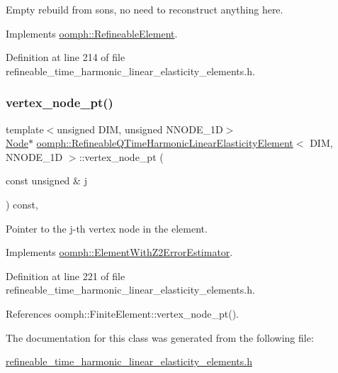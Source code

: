 Empty rebuild from sons, no need to reconstruct anything here. 



Implements \hyperlink{classoomph_1_1RefineableElement_a33324be27833fa4b78279d17158215fa}{oomph\+::\+Refineable\+Element}.



Definition at line 214 of file refineable\+\_\+time\+\_\+harmonic\+\_\+linear\+\_\+elasticity\+\_\+elements.\+h.

\mbox{\label{classoomph_1_1RefineableQTimeHarmonicLinearElasticityElement_ab78845396d1b78ba751e2feb2bf2c8a9}} 
\subsubsection{\texorpdfstring{vertex\+\_\+node\+\_\+pt()}{vertex\_node\_pt()}}
{\footnotesize\ttfamily template$<$unsigned D\+IM, unsigned N\+N\+O\+D\+E\+\_\+1D$>$ \\
\hyperlink{classoomph_1_1Node}{Node}$\ast$ \hyperlink{classoomph_1_1RefineableQTimeHarmonicLinearElasticityElement}{oomph\+::\+Refineable\+Q\+Time\+Harmonic\+Linear\+Elasticity\+Element}$<$ D\+IM, N\+N\+O\+D\+E\+\_\+1D $>$\+::vertex\+\_\+node\+\_\+pt (\begin{DoxyParamCaption}\item[{const unsigned \&}]{j }\end{DoxyParamCaption}) const\hspace{0.3cm}{\ttfamily [inline]}, {\ttfamily [virtual]}}



Pointer to the j-\/th vertex node in the element. 



Implements \hyperlink{classoomph_1_1ElementWithZ2ErrorEstimator_a0eedccc33519f852c5dc2055ddf2774b}{oomph\+::\+Element\+With\+Z2\+Error\+Estimator}.



Definition at line 221 of file refineable\+\_\+time\+\_\+harmonic\+\_\+linear\+\_\+elasticity\+\_\+elements.\+h.



References oomph\+::\+Finite\+Element\+::vertex\+\_\+node\+\_\+pt().



The documentation for this class was generated from the following file\+:\begin{DoxyCompactItemize}
\item 
\hyperlink{refineable__time__harmonic__linear__elasticity__elements_8h}{refineable\+\_\+time\+\_\+harmonic\+\_\+linear\+\_\+elasticity\+\_\+elements.\+h}\end{DoxyCompactItemize}
